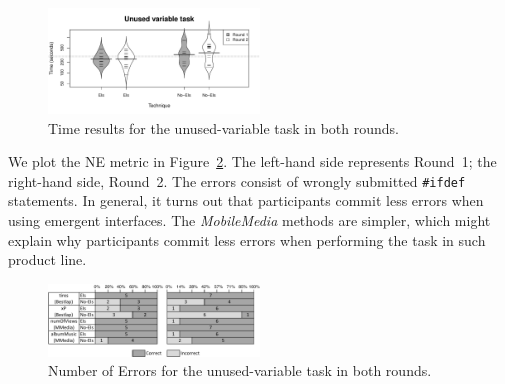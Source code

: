 
\begin{figure}[tp]
\centering
\includegraphics[width=0.5\textwidth]{images/Beanplots-UV.pdf}
\caption{Time results for the unused-variable task in both rounds.}
\label{fig:beanplots-uv}
\end{figure}



We plot the NE metric in Figure~\ref{fig:barplots-ne2}. The left-hand side represents Round~1; the right-hand side, Round~2. The errors consist of wrongly submitted \texttt{\#ifdef} statements. In general, it turns out that participants commit less errors when using emergent interfaces. The \textit{MobileMedia} methods are simpler, which might explain why participants commit less errors when performing the task in such product line.

\begin{figure}[tp]
\centering
\includegraphics[width=0.5\textwidth]{images/Barplot-NE2.pdf}
\caption{Number of Errors for the unused-variable task in both rounds.}
\label{fig:barplots-ne2}
\end{figure}

